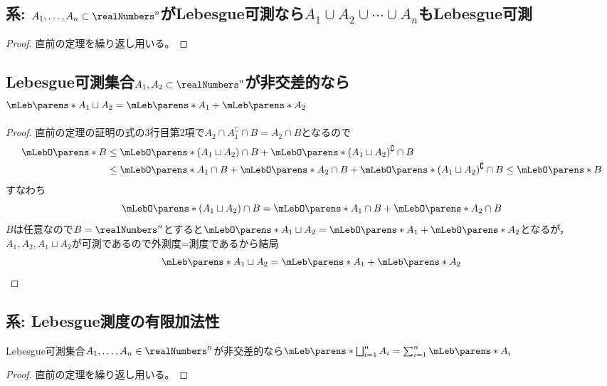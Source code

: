         \subsection{系: \texorpdfstring{$A_1,\dotsc,A_n\subset\realNumbers^n$}{A1,...,An⊂R\string^n}がLebesgue可測なら\texorpdfstring{$A_1\cup A_2\cup\dotsb\cup A_n$}{A1,...,Anの和集合}もLebesgue可測}
            \begin{proof}
                直前の定理を繰り返し用いる。
            \end{proof}
        \subsection{Lebesgue可測集合\texorpdfstring{$A_1,A_2\subset\realNumbers^n$}{A1,A2⊂R\string^n}が非交差的なら\texorpdfstring{$\mLeb\parens*{A_1\sqcup A_2} = \mLeb\parens*{A_1} + \mLeb\parens*{A_2}$}{A1とA2の和集合のLebesgue測度はそれぞれのLebesgue測度の和に等しい}}
            \begin{proof}
                直前の定理の証明の式の3行目第2項で$A_2\cap A_1^\complement\cap B = A_2\cap B$となるので
                \begin{align*}
                    \mLebO\parens*{B} &\leq \mLebO\parens*{(A_1\sqcup A_2)\cap B} + \mLebO\parens*{(A_1\sqcup A_2)^\complement\cap B} \\
                    &\leq \mLebO\parens*{A_1\cap B} + \mLebO\parens*{A_2\cap B} + \mLebO\parens*{(A_1\sqcup A_2)^\complement\cap B} \leq \mLebO\parens*{B}
                \end{align*}
                すなわち
                \[ \mLebO\parens*{(A_1\sqcup A_2)\cap B} = \mLebO\parens*{A_1\cap B} + \mLebO\parens*{A_2\cap B} \]
                $B$は任意なので$B=\realNumbers^n$とすると$\mLebO\parens*{A_1\sqcup A_2} = \mLebO\parens*{A_1} + \mLebO\parens*{A_2}$となるが，$A_1,A_2, A_1\sqcup A_2$が可測であるので外測度=測度であるから結局
                \[ \mLeb\parens*{A_1\sqcup A_2} = \mLeb\parens*{A_1} + \mLeb\parens*{A_2} \]
            \end{proof}
        \subsection{系: Lebesgue測度の有限加法性}
            Lebesgue可測集合$A_1,\dotsc,A_n\in\realNumbers^n$が非交差的なら$\mLeb\parens*{\bigsqcup_{i=1}^n A_i} = \sum_{i=1}^n \mLeb\parens*{A_i}$
            \begin{proof}
                直前の定理を繰り返し用いる。
            \end{proof}
